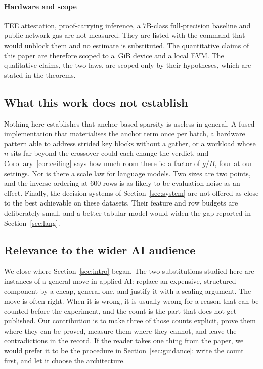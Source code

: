 \paragraph{Hardware and scope} TEE attestation, proof-carrying inference, a
$7$B-class full-precision baseline and public-network gas are not measured. They
are listed with the command that would unblock them and no estimate is substituted.
The quantitative claims of this paper are therefore scoped to a
\GpuMemGiB\,GiB device and a local EVM. The qualitative claims, the two laws, are
scoped only by their hypotheses, which are stated in the theorems.

\subsection{What this work does not establish}

Nothing here establishes that anchor-based sparsity is useless in general. A
fused implementation that materialises the anchor term once per batch, a hardware
pattern able to address strided key blocks without a gather, or a workload whose
$n$ sits far beyond the crossover could each change the verdict, and
Corollary~\ref{cor:ceiling} says how much room there is: a factor of $g/B$, four
at our settings. Nor is there a scale law for language models. Two sizes are two
points, and the inverse ordering at $600$ rows is as likely to be evaluation noise
as an effect. Finally, the decision systems of Section~\ref{sec:system} are not
offered as close to the best achievable on these datasets. Their feature and row
budgets are deliberately small, and a better tabular model would widen the gap
reported in Section~\ref{sec:lang}.

\subsection{Relevance to the wider AI audience}

We close where Section~\ref{sec:intro} began. The two substitutions studied here
are instances of a general move in applied AI: replace an expensive, structured
component by a cheap, general one, and justify it with a scaling argument. The
move is often right. When it is wrong, it is usually wrong for a reason that can be
counted before the experiment, and the count is the part that does not get
published. Our contribution is to make three of those counts explicit, prove them
where they can be proved, measure them where they cannot, and leave the
contradictions in the record. If the reader takes one thing from the paper, we
would prefer it to be the procedure in Section~\ref{sec:guidance}: write the
count first, and let it choose the architecture.
